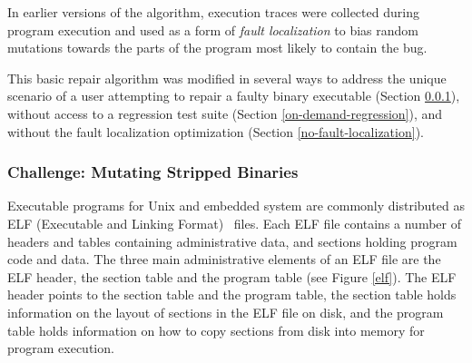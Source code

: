 \documentclass{sigcomm-alternate}
\begin{document}
{%
In earlier versions of the algorithm, execution traces were collected
during program execution and used as a form of \emph{fault
  localization} to bias random mutations towards the parts of the
program most likely to contain the bug.

This basic repair algorithm was modified in several ways to address
the unique scenario of a user attempting to repair a faulty binary
executable (Section \ref{mutate-mips}), without access to a regression
test suite (Section \ref{on-demand-regression}), and without the fault
localization optimization (Section \ref{no-fault-localization}).

\subsubsection{Challenge: Mutating Stripped Binaries}
\label{mutate-mips}

Executable programs for Unix and embedded system are commonly distributed
as ELF (Executable and Linking Format)~\cite{tis1995tool} files. 
Each ELF file contains a number of headers
and tables containing administrative data, and sections holding
program code and data.  The three main administrative elements of an
ELF file are the ELF header, the section table and the program table
(see Figure \ref{elf}).  The ELF header points to the section table and the
program table, the section table holds information on the layout of
sections in the ELF file on disk, and the program table holds
information on how to copy sections from disk into memory for program
execution.

}
\end{document}
